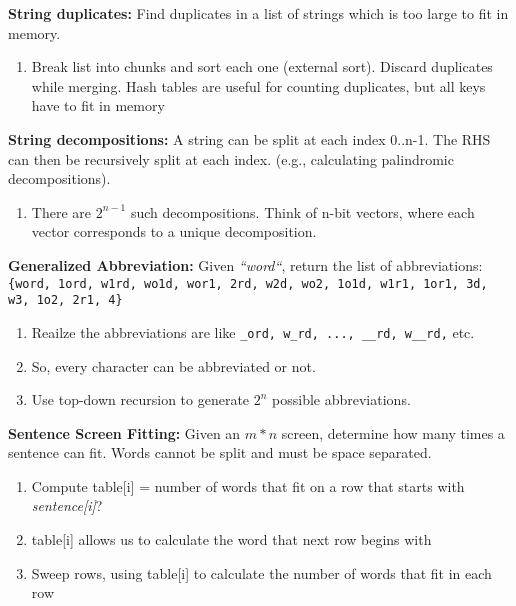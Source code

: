 \documentclass[12pt]{article}
\begin{document}
\vspace{5mm}
\noindent
\textbf{String duplicates:}
Find duplicates in a list of strings which is too large to fit in memory.
\begin{enumerate}
\item Break list into chunks and sort each one (external sort). Discard duplicates while merging. 
Hash tables are useful for counting duplicates, but all keys have to fit in memory
\end{enumerate}


\vspace{5mm}
\noindent
\textbf{String decompositions:}
A string can be split at each index 0..n-1. The RHS can then be recursively split at each index.
(e.g., calculating palindromic decompositions).
\begin{enumerate}
\item There are $2^{n-1}$ such decompositions. Think of n-bit vectors, where each vector corresponds to a unique decomposition.  
\end{enumerate}


\vspace{5mm}
\noindent
\textbf{Generalized Abbreviation:}
Given \emph{``word``}, return the list of abbreviations: \texttt{\{word,
1ord, w1rd, wo1d, wor1, 2rd, w2d, wo2, 1o1d, w1r1, 1or1, 3d, w3, 1o2, 2r1, 4\}}
\begin{enumerate}
\item Reailze the abbreviations are like \texttt{\_ord, w\_rd, ..., \_\_rd, w\_\_rd,} etc.
\item So, every character can be abbreviated or not.
\item Use top-down recursion to generate $2^{n}$ possible abbreviations.
\end{enumerate}


\vspace{5mm}
\noindent
\textbf{Sentence Screen Fitting:}
Given an $m * n$ screen, determine how many times a sentence can fit. Words cannot be split and must be space separated.
\begin{enumerate}
\item Compute table[i] = number of words that fit on a row that starts with \emph{sentence[i]}?
\item table[i] allows us to calculate the word that next row begins with
\item Sweep rows, using table[i] to calculate the number of words that fit in each row
\end{enumerate}
\end{document}
